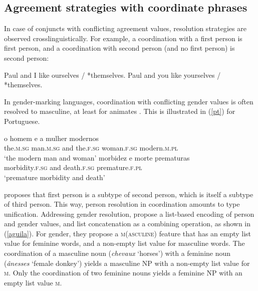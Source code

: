 {\subsection{Agreement strategies with coordinate phrases}


In case of conjuncts with conflicting agreement values, resolution strategies are observed 
crosslinguistically. For example, a coordination with a first person is first person, and a coordination with second person (and no first person) is second person:

\begin{exe}
 \ex
\begin{xlista}
\ex Paul and I like ourselves / *themselves.
\ex Paul and you like yourselves / *themselves.
\end{xlista}
\end{exe}

In gender-marking languages, coordination with conflicting gender values is often resolved to 
masculine, at least for animates \citep[186]{Corbet91}. This is illustrated in (\ref{pt}) for Portuguese.

\begin{exe}
 \ex
\begin{xlista}
\ex \gll o homem e a mulher modernos \\
the.\textsc{m.sg} man.\textsc{m.sg} and the.\textsc{f.sg} woman.\textsc{f.sg} modern.\textsc{m.pl} \\
\glt `the modern man and woman'
\ex \gll morbidez e morte prematuras \\
morbidity.\textsc{f.sg} and death.\textsc{f.sg} premature.\textsc{f.pl}\\
\glt `premature morbidity and death'\\
\citep[433]{Villavicencio:Sadler:ea:05}
\end{xlista}\label{pt}
\end{exe}


\citet[]{Sag:03} proposes that first person is a subtype of second person, which is itself a subtype of third person. This way, person resolution in coordination amounts to type unification. Addressing gender resolution, \citet{Aguila:Crysmann:18} propose a list-based encoding of person and gender values, and list concatenation as a combining operation, as shown in (\ref{aguila}). For gender, they propose a \textsc{m}(\textsc{asculine}) feature that has an empty list value for feminine words, and a non-empty list value for masculine words.  The coordination of a masculine noun (\emph{chevaux} `horses') with a feminine noun (\emph{\^{a}nesses} `female donkey')  yields a masculine NP with a non-empty list value for \textsc{m}. Only the coordination of two feminine nouns yields a feminine NP with an empty list value \textsc{m}.
 
}
